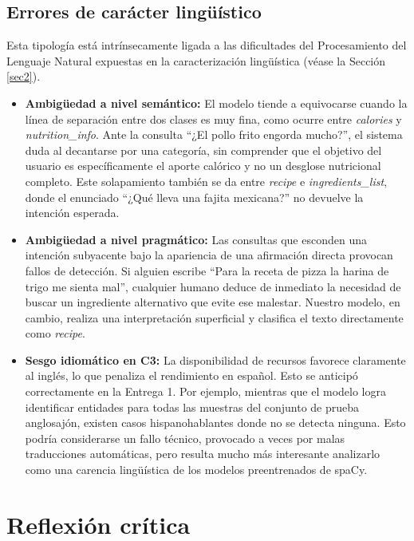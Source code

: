 \documentclass[11pt,a4paper,twoside]{article}
\theoremstyle{definition}
\numberwithin{equation}{section}
\begin{document}
\subsection{Errores de carácter lingüístico}
Esta tipología está intrínsecamente ligada a las dificultades del Procesamiento del Lenguaje Natural expuestas en la caracterización lingüística (véase la Sección \ref{sec2}).
\begin{itemize}
	\item \textbf{Ambigüedad a nivel semántico:} El modelo tiende a equivocarse cuando la línea de separación entre dos clases es muy fina, como ocurre entre \textit{calories} y \textit{nutrition\_info}. Ante la consulta ``¿El pollo frito engorda mucho?'', el sistema duda al decantarse por una categoría, sin comprender que el objetivo del usuario es específicamente el aporte calórico y no un desglose nutricional completo. Este solapamiento también se da entre \textit{recipe} e \textit{ingredients\_list}, donde el enunciado ``¿Qué lleva una fajita mexicana?'' no devuelve la intención esperada.
	
	\item \textbf{Ambigüedad a nivel pragmático:} Las consultas que esconden una intención subyacente bajo la apariencia de una afirmación directa provocan fallos de detección. Si alguien escribe ``Para la receta de pizza la harina de trigo me sienta mal'', cualquier humano deduce de inmediato la necesidad de buscar un ingrediente alternativo que evite ese malestar. Nuestro modelo, en cambio, realiza una interpretación superficial y clasifica el texto directamente como \textit{recipe}.
	
	\item \textbf{Sesgo idiomático en C3:} La disponibilidad de recursos favorece claramente al inglés, lo que penaliza el rendimiento en español. Esto se anticipó correctamente en la Entrega 1. Por ejemplo, mientras que el modelo logra identificar entidades para todas las muestras del conjunto de prueba anglosajón, existen casos hispanohablantes donde no se detecta ninguna. Esto podría considerarse un fallo técnico, provocado a veces por malas traducciones automáticas, pero resulta mucho más interesante analizarlo como una carencia lingüística de los modelos preentrenados de spaCy.
\end{itemize}


\section{Reflexión crítica}
\end{document}
